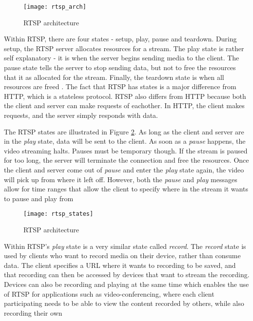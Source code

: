 \documentclass[12pt]{article}
\begin{document}
\begin{figure}[h]
  \begin{center}
    \texttt{[image: rtsp\_arch]}
    \caption{RTSP architecture}
    \label{fig:rtsp_arch}
  \end{center}
\end{figure}

Within RTSP, there are four states - setup, play, pause and teardown.  During setup, the RTSP server allocates resources for a stream.  The play state is rather self explanatory - it is when the server begins sending media to the client.  The pause state tells the server to stop sending data, but not to free the resources that it as allocated for the stream.  Finally, the teardown state is when all resources are freed \cite{rtsp_ieee}.  The fact that RTSP has states is a major difference from HTTP, which is a stateless protocol.  RTSP also differs from HTTP because both the client and server can make requests of eachother.  In HTTP, the client makes requests, and the server simply responds with data.

The RTSP states are illustrated in Figure \ref{fig:rtsp_states}.  As long as the client and server are in the \textit{play} state, data will be sent to the client.  As soon as a \textit{pause} happens, the video streaming halts.  Pauses must be temporary though.  If the stream is paused for too long, the server will terminate the connection and free the resources.  Once the client and server come out of \textit{pause} and enter the \textit{play} state again, the video will pick up from where it left off.  However, both the \textit{pause} and \textit{play} messages allow for time ranges that allow the client to specify where in the stream it wants to pause and play from \cite{rtsp_ieee}

\begin{figure}[h]
  \begin{center}
    \texttt{[image: rtsp\_states]}
    \caption{RTSP architecture}
    \label{fig:rtsp_states}
  \end{center}
\end{figure}

Within RTSP's \textit{play} state is a very similar state called \textit{record}.  The \textit{record} state is used by clients who want to record media on their device, rather than consume data.  The client specifies a URL where it wants to recording to be saved, and that recording can then be accessed by devices that want to stream the recording.  Devices can also be recording and playing at the same time which enables the use of RTSP for applications such as video-conferencing, where each client participating needs to be able to view the content recorded by others, while also recording their own \cite{rtsp_ieee}
\end{document}
